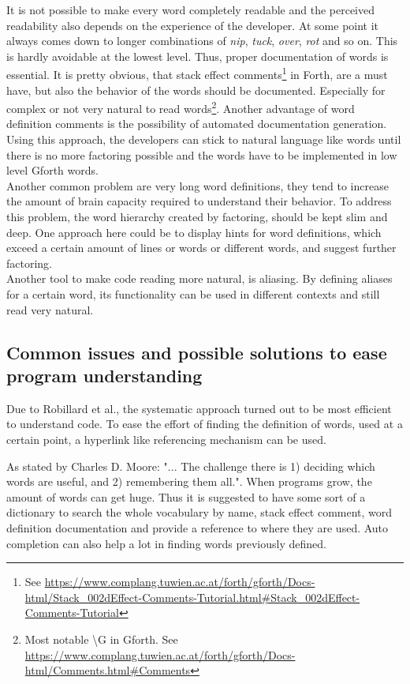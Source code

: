 It is not possible to make every word completely readable and the perceived readability also depends on the experience of the developer. At some point  it always comes down to longer combinations of \emph{nip}, \emph{tuck}, \emph{over}, \emph{rot} and so on. This is hardly avoidable at the lowest level. Thus, proper documentation of words is essential. It is pretty obvious, that stack effect comments\footnote{See \url{https://www.complang.tuwien.ac.at/forth/gforth/Docs-html/Stack\_002dEffect-Comments-Tutorial.html\#Stack\_002dEffect-Comments-Tutorial}} in Forth, are a must have, but also the behavior of the words should be documented. Especially for complex or not very natural to read words\footnote{Most notable \textbackslash G in Gforth. See \url{https://www.complang.tuwien.ac.at/forth/gforth/Docs-html/Comments.html\#Comments}}. Another advantage of word definition comments is the possibility of automated documentation generation.\\
Using this approach, the developers can stick to natural language like words until there is no more factoring possible and the words have to be implemented in low level Gforth words.
\\
Another common problem are very long word definitions, they tend to increase the amount of brain capacity required to understand their behavior. To address this problem, the word hierarchy created by factoring, should be kept slim and deep. One approach here could be to display hints for word definitions, which exceed a certain amount of lines or words or different words, and suggest further factoring.
\\
Another tool to make code reading more natural, is aliasing. By defining aliases for a certain word, its functionality can be used in different contexts and still read very natural.

\subsection{Common issues and possible solutions to ease program understanding}

Due to Robillard et al.\cite{Robillard:2004:EDI:1042203.1042417}, the systematic approach turned out to be most efficient to understand code. To ease the effort of finding the definition of words, used at a certain point, a hyperlink like referencing mechanism can be used.

As stated by \gls{Charles D. Moore}\cite{Biancuzzi:2009:MPC:1592983}: "... The challenge there is 1) deciding which words are useful, and 2) remembering them all.". When programs grow, the amount of words can get huge. Thus it is suggested to have some sort of a dictionary to search the whole vocabulary by name, stack effect comment, word definition documentation and provide a reference to where they are used. Auto completion can also help a lot in finding words previously defined.

